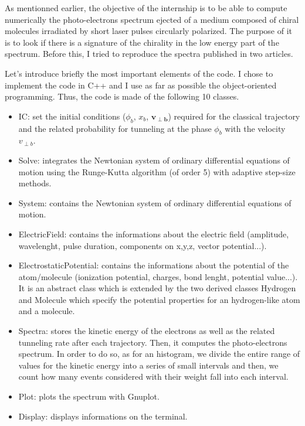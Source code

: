 \documentclass[a4paper]{article}
\begin{document}
As mentionned earlier, the objective of the internship is to be able to compute numerically the photo-electrons spectrum ejected of a medium composed of chiral molecules irradiated by short laser pulses circularly polarized. The purpose of it is to look if there is a signature of the chirality in the low energy part of the spectrum. Before this, I tried to reproduce the spectra published in two articles. 
\par
Let's introduce briefly the most important elements of the code. I chose to implement the code in C++ and I use as far as possible the object-oriented programming. Thus, the code is made of the following 10 classes.
\begin{itemize}
\item
IC: set the initial conditions ($\phi_{b}$, $x_{b}$, $\mathbf{v_{\perp b}}$) required for the classical trajectory and the related probability for tunneling at the phase $\phi_{b}$ with the velocity $v_{\perp b}$.
\item
Solve: integrates the Newtonian system of ordinary differential equations of motion using the Runge-Kutta algorithm (of order 5) with adaptive step-size methods.
\item
System: contains the Newtonian system of ordinary differential equations of motion.
\item
ElectricField: contains the informations about the electric field (amplitude, wavelenght, pulse duration, components on x,y,z, vector potential...).
\item
ElectrostaticPotential: contains the informations about the potential of the atom/molecule (ionization potential, charges, bond lenght, potential value...). It is an abstract class which is extended by the two derived classes Hydrogen and Molecule which specify the potential properties for an hydrogen-like atom and a molecule. 
\item
Spectra: stores the kinetic energy of the electrons as well as the related tunneling rate after each trajectory. Then, it computes the photo-electrons spectrum. In order to do so, as for an histogram, we divide the entire range of values for the kinetic energy into a series of small intervals and then, we count how many events considered with their weight fall into each interval.
\item
Plot: plots the spectrum with Gnuplot.
\item
Display: displays informations on the terminal. 
\end{itemize}
\par
\end{document}
